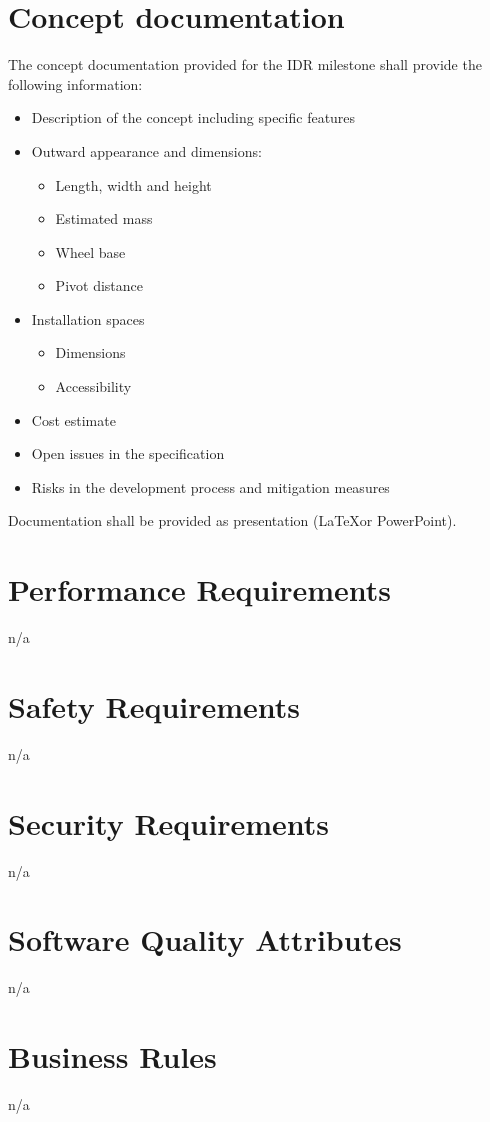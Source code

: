 \documentclass{scrreprt}
\begin{document}
\section{Concept documentation}
The concept documentation provided for the IDR milestone shall provide the following information:
\begin{itemize}
	\item Description of the concept including specific features
	\item Outward appearance and dimensions:
	\begin{itemize}
		\item Length, width and height
		\item Estimated mass
		\item Wheel base
		\item Pivot distance
	\end{itemize}
	\item Installation spaces
	\begin{itemize}
		\item Dimensions
		\item Accessibility
		\end{itemize}
	\item Cost estimate
	\item Open issues in the specification
	\item Risks in the development process and mitigation measures
\end{itemize}


Documentation shall be provided as presentation (\LaTeX or PowerPoint).
\section{Performance Requirements}
n/a

\section{Safety Requirements}
n/a
\section{Security Requirements}
n/a

\section{Software Quality Attributes}
n/a

\section{Business Rules}
n/a

\end{document}

